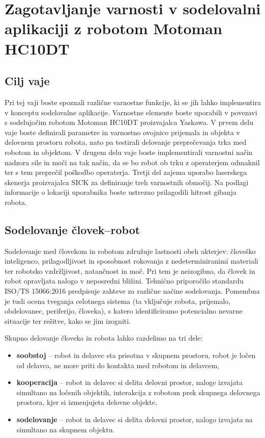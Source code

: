 \chapter{Zagotavljanje varnosti v sodelovalni aplikaciji z robotom Motoman HC10DT}%

\begin{mdframed}[backgroundcolor=green!20, shadow=true,roundcorner=8pt]
	\vspace{-0.35cm}
	
	\section{Cilj vaje}
	
	Pri tej vaji boste spoznali različne varnostne funkcije, ki se jih lahko implementira v konceptu sodelovalne aplikacije. Varnostne elemente boste uporabili v povezavi s sodelujočim robotom Motoman HC10DT proizvajalca Yaskawa. V prvem delu vaje boste definirali parametre in varnostno ovojnico prijemala in objekta v delovnem prostoru robota, nato pa testirali delovanje preprečevanja trka med robotom in objektom. V drugem delu vaje boste implementirali varnostni način nadzora sile in moči na tak način, da se bo robot ob trku z operaterjem  odmaknil ter s tem preprečil poškodbo operaterja. Tretji del zajema uporabo laserskega skenerja proizvajalca SICK za definiranje treh varnostnih območij. Na podlagi informacije o lokaciji uporabnika boste ustrezno prilagodili hitrost gibanja robota.
	
\end{mdframed}

\section{Sodelovanje človek--robot}

Sodelovanje med človekom in robotom združuje lastnosti obeh akterjev: človeško inteligenco, prilagodljivost in sposobnost rokovanja z nedeterminiranimi materiali ter robotsko vzdržljivost, natančnost in moč. Pri tem je neizogibno, da človek in robot opravljata nalogo v neposredni bližini. Tehnično priporočilo standardu ISO/TS 15066:2016 predpisuje zahteve za različne načine sodelovanja. Pomembna je tudi ocena tveganja celotnega sistema (ta vključuje robota, prijemalo, obdelovanec, periferijo, človeka), s katero identificiramo potencialno nevarne situacije ter rešitve, kako se jim izogniti.

Skupno delovanje človeka in robota lahko razdelimo na tri dele:
\begin{itemize}
	\item \textbf{soobstoj} -- robot in delavec sta prisotna v skupnem prostoru, robot je ločen od delavca, ne more priti do kontakta med robotom in delavcem,
	\item \textbf{kooperacija} -- robot in delavec si delita delovni prostor, naloge izvajata simultano na ločenih objektih, interakcija z robotom prek skupnega delovnega prostora, kjer si izmenjujeta delovne objekte,
	\item  \textbf{sodelovanje} -- robot in delavec si delita delovni prostor, nalogo izvajata na simultano na skupnem objektu.
\end{itemize}


